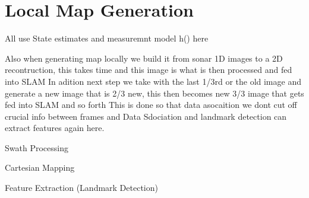 \section{Local Map Generation}

All use State estimates and measuremnt model h() here

Also when generating map locally we build it from sonar 1D images to a 2D recontruction, this takes time and this image is what is then processed and fed into SLAM
In adition next step we take with the last 1/3rd or the old image and generate a new image that is 2/3 new, this then becomes new 3/3 image that gets fed into SLAM and so forth
This is done so that data asocaition we dont cut off crucial info between frames and Data Sdociation and landmark detection can extract features again here.

Swath Processing

Cartesian Mapping

Feature Extraction (Landmark Detection)